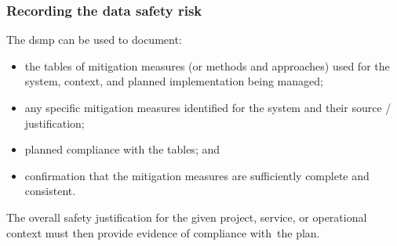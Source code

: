\subsubsection{Recording the data safety risk }
The \gls{dsmp} can be used to document:
\begin{itemize}
  \item the tables of \gls{mitigation} measures (or methods and approaches) used for the system, context, and planned implementation \cbstart being managed\cbend;
  \item any specific \gls{mitigation} measures identified for the system and their source / justification;
  \item planned compliance with the tables; and
  \item confirmation that the \gls{mitigation} measures are sufficiently complete and consistent.
\end{itemize}  
The overall safety justification for the given project, service, or operational context must then provide evidence of compliance with\ the plan.
